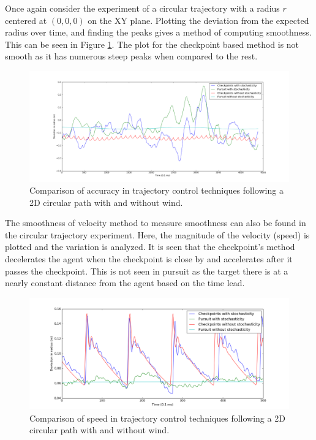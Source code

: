 \documentclass[hidelinks,BTech]{iitmdiss}
\begin{document}
Once again consider the experiment of a circular trajectory with a radius $r$ centered at $(0,0,0)$ on the XY plane. Plotting the deviation from the expected radius over time, and finding the peaks gives a method of computing smoothness. This can be seen in Figure \ref{fig:TrajectoryComparison}. The plot for the checkpoint based method is not smooth as it has numerous steep peaks when compared to the rest.

\begin{figure}[H]
  \centering
    \includegraphics[width=\textwidth]{comparison_accuracy.png}
    \caption{Comparison of accuracy in trajectory control techniques following a 2D circular path with and without wind.}
    \label{fig:TrajectoryComparison}
\end{figure}

The smoothness of velocity method to measure smoothness can also be found in the circular trajectory experiment. Here, the magnitude of the velocity (speed) is plotted and the variation is analyzed. It is seen that the checkpoint's method decelerates the agent when the checkpoint is close by and accelerates after it passes the checkpoint. This is not seen in pursuit as the target there is at a nearly constant distance from the agent based on the time lead.

\begin{figure}[H]
  \centering
    \includegraphics[width=\textwidth]{comparison_velocity.png}
    \caption{Comparison of speed in trajectory control techniques following a 2D circular path with and without wind.}
\end{figure}
\end{document}
